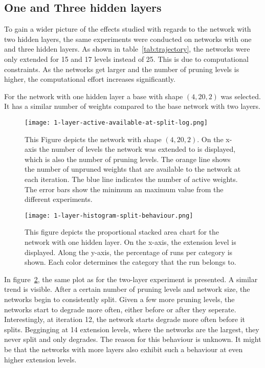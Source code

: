 \subsection{One and Three hidden layers}
To gain a wider picture of the effects studied with regards to the network with two hidden layers, the same experiments were conducted on networks with one and three hidden layers.
As shown in table~\ref{tab:trajectory}, the networks were only extended for 15 and 17 levels instead of 25. 
This is due to computational constraints. As the networks get larger and the number of pruning levels is higher, the computational effort increases significantly.

For the network with one hidden layer a base with shape $(4,20,2)$ was selected.
It has a similar number of weights compared to the base network with two layers.

\begin{figure}[ht]
    \centering
    \texttt{[image: 1-layer-active-available-at-split-log.png]}
    \caption{This Figure depicts the network with shape $(4,20,2)$.
    On the x-axis the number of levels the network was extended to is displayed, which is also the number of pruning levels.
    The orange line shows the number of unpruned weights that are available to the network at each iteration.
    The blue line indicates the number of active weights.
    The error bars show the minimum an maximum value from the different experiments.
    }\label{fig:1layer-active}
\end{figure}

\begin{figure}[ht]
    \centering
    \texttt{[image: 1-layer-histogram-split-behaviour.png]}
    \caption{
        This figure depicts the proportional stacked area chart for the network with one hidden layer.
        On the x-axis, the extension level is displayed. 
        Along the y-axis, the percentage of runs per category is shown.
        Each color determines the category that the run belongs to.
    }\label{fig:1layer-histogram}
\end{figure}

In figure~\ref{fig:1layer-histogram}, the same plot as for the two-layer experiment is presented.
A similar trend is visible.
After a certain number of pruning levels and network size, the networks begin to consistently split.
Given a few more pruning levels, the networks start to degrade more often, either before or after they seperate.
Interestingly, at iteration 12, the network starts degrade more often before it splits.
Begginging at 14 extension levels, where the networks are the largest, they never split and only degrades.
The reason for this behaviour is unknown.
It might be that the networks with more layers also exhibit such a behaviour at even higher extension levels. 

